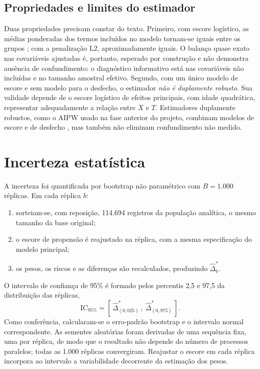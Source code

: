 \documentclass[11pt,a4paper]{article}
\begin{document}
\subsection{Propriedades e limites do estimador}\label{sec:propriedades}

Duas propriedades precisam constar do texto. Primeiro, com escore logístico, as médias
ponderadas dos termos incluídos no modelo tornam-se iguais entre os grupos \cite{li2018};
com a penalização L2, aproximadamente iguais. O balanço quase exato nas covariáveis
ajustadas é, portanto, esperado por construção e não demonstra ausência de confundimento:
o diagnóstico informativo está nas covariáveis não incluídas e no tamanho amostral
efetivo. Segundo, com um único modelo de escore e sem modelo para o desfecho, o estimador
\emph{não é duplamente robusto}. Sua validade depende de o escore logístico de efeitos
principais, com idade quadrática, representar adequadamente a relação entre $X$ e $T$.
Estimadores duplamente robustos, como o AIPW usado na fase anterior do projeto, combinam
modelos de escore e de desfecho \cite{funk2011}, mas também não eliminam confundimento
não medido.

\section{Incerteza estatística}\label{sec:incerteza}

A incerteza foi quantificada por bootstrap não paramétrico com $B = 1.000$ réplicas. Em
cada réplica $b$:
\begin{enumerate}
\item sorteiam-se, com reposição, 114.694 registros da população analítica, o mesmo
tamanho da base original;
\item o escore de propensão é reajustado na réplica, com a mesma especificação do modelo
principal;
\item os pesos, os riscos e as diferenças são recalculados, produzindo
$\hat{\Delta}^{*}_{b}$.
\end{enumerate}
O intervalo de confiança de 95\% é formado pelos percentis 2,5 e 97,5 da distribuição das
réplicas,
\begin{equation}\label{eq:ic}
\mathrm{IC}_{95\%} = \left[\, \hat{\Delta}^{*}_{(0{,}025)}\,,\; \hat{\Delta}^{*}_{(0{,}975)} \,\right].
\end{equation}
Como conferência, calcularam-se o erro-padrão bootstrap e o intervalo normal
correspondente. As sementes aleatórias foram derivadas de uma sequência fixa, uma por
réplica, de modo que o resultado não depende do número de processos paralelos; todas as
1.000 réplicas convergiram. Reajustar o escore em cada réplica incorpora ao intervalo a
variabilidade decorrente da estimação dos pesos.
\end{document}
